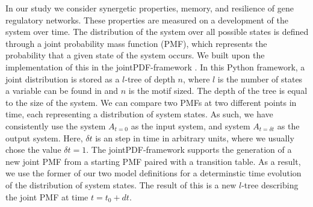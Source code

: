 \documentclass[../main.tex]{subfiles}
\begin{document}
In our study we consider synergetic properties, memory, and resilience of gene regulatory networks.
These properties are measured on a development of the system over time.
The distribution of the system over all possible states is defined through a joint probability mass function (PMF), which represents the probability that a given state of the system occurs.
We built upon the implementation of this in the jointPDF-framework \cite{jointpdf}.
In this Python framework, a joint distribution is stored as a $l$-tree of depth $n$, where $l$ is the number of states a variable can be found in and $n$ is the motif sized.
The depth of the tree is equal to the size of the system.
We can compare two PMFs at two different points in time, each representing a distribution of system states.
As such, we have consistently use the system $A_{t=0}$ as the input system, and system $A_{t=\delta t}$ as the output system.
Here, $\delta t$ is an step in time in arbitrary units, where we usually chose the value $\delta t = 1$. 
The jointPDF-framework supports the generation of a new joint PMF from a starting PMF paired with a transition table.
As a result, we use the former of our two model definitions for a determinstic time evolution of the distribution of system states.
The result of this is a new $l$-tree describing the joint PMF at time $t=t_0+dt$.
\end{document}
